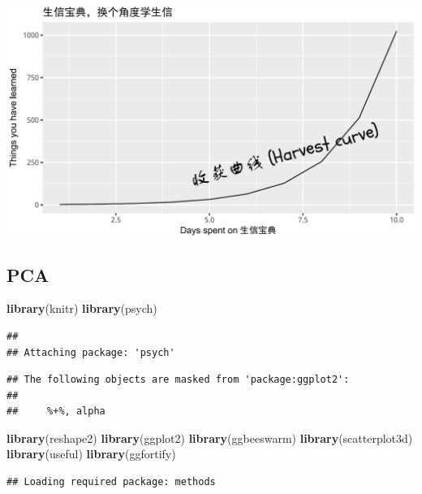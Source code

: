 \documentclass[]{article}
\newenvironment{Shaded}{\begin{snugshade}}{\end{snugshade}}
\newcommand{\KeywordTok}[1]{\textcolor[rgb]{0.13,0.29,0.53}{\textbf{{#1}}}}
\newcommand{\NormalTok}[1]{{#1}}
\numberwithin{figure}{section}
\numberwithin{table}{section}
\theoremstyle{definition}
\theoremstyle{definition}
\theoremstyle{definition}
\theoremstyle{remark}
\begin{document}
\begin{center}\includegraphics[width=0.95\linewidth,height=0.7\textheight,keepaspectratio]{images/sxbd_font} \end{center}

\subsection{PCA}\label{pca}

\begin{Shaded}
\begin{Highlighting}[]
\KeywordTok{library}\NormalTok{(knitr)}
\KeywordTok{library}\NormalTok{(psych)}
\end{Highlighting}
\end{Shaded}

\begin{verbatim}
## 
## Attaching package: 'psych'
\end{verbatim}

\begin{verbatim}
## The following objects are masked from 'package:ggplot2':
## 
##     %+%, alpha
\end{verbatim}

\begin{Shaded}
\begin{Highlighting}[]
\KeywordTok{library}\NormalTok{(reshape2)}
\KeywordTok{library}\NormalTok{(ggplot2)}
\KeywordTok{library}\NormalTok{(ggbeeswarm)}
\KeywordTok{library}\NormalTok{(scatterplot3d)}
\KeywordTok{library}\NormalTok{(useful)}
\KeywordTok{library}\NormalTok{(ggfortify)}
\end{Highlighting}
\end{Shaded}

\begin{verbatim}
## Loading required package: methods
\end{verbatim}
\end{document}
